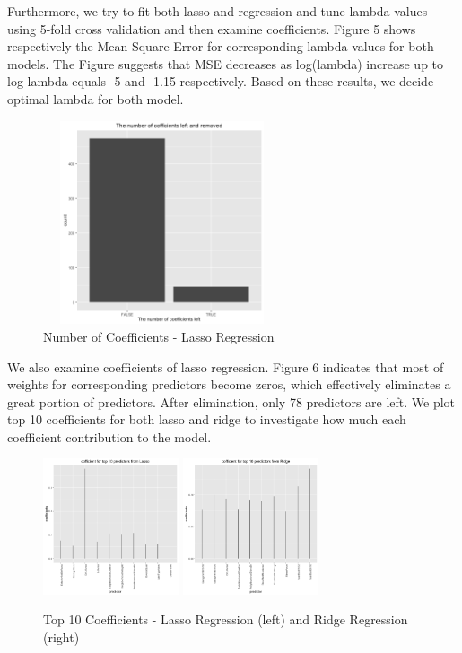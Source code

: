 \documentclass[letterpaper, 10 pt, conference]{ieeeconf}\usepackage[]{graphicx}\usepackage[]{color}
\begin{document}
Furthermore, we try to fit both lasso and regression and tune lambda values using 5-fold cross validation and then examine coefficients. Figure 5 shows respectively the Mean Square Error for corresponding lambda values for both models. The Figure suggests that MSE decreases as log(lambda) increase up to log lambda equals -5 and  -1.15 respectively. Based on these results, we decide optimal lambda for both model. 

   \begin{figure}[thpb]
      \centering
      \includegraphics[width =  7cm, height = 6cm]{../images/model_lasso_number_of_coefficients_left.png}
      \caption{Number of Coefficients - Lasso Regression}
      \label{figurelabel}
   \end{figure}

We also examine coefficients of lasso regression. Figure 6 indicates that most of weights for corresponding predictors become zeros, which effectively eliminates a great portion of predictors. After elimination, only 78 predictors are left. We plot top 10 coefficients for both lasso and ridge to investigate how much each coefficient contribution to the model. 

   \begin{figure}[thpb]
      \centering
      \includegraphics[width =  4cm, height = 4cm]{../images/model_lasso_coefficients_top_10.png}
      \includegraphics[width =  4cm, height = 4cm]{../images/model_ridge_coefficients_top_10.png}
      \caption{Top 10 Coefficients - Lasso Regression (left) and Ridge Regression (right)}
      \label{figurelabel}
   \end{figure}
\end{document}
